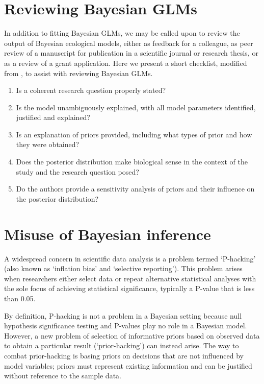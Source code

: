 \documentclass[
]{book}
\begin{document}
\hypertarget{reviewing-bayesian-glms}{%
\section{Reviewing Bayesian GLMs}\label{reviewing-bayesian-glms}}

In addition to fitting Bayesian GLMs, we may be called upon to review the output of Bayesian ecological models, either as feedback for a colleague, as peer review of a manuscript for publication in a scientific journal or research thesis, or as a review of a grant application. Here we present a short checklist, modified from \citet{Depaoli_2017}, to assist with reviewing Bayesian GLMs.

\begin{enumerate}
\def\labelenumi{\arabic{enumi}.}
\item
  Is a coherent research question properly stated?
\item
  Is the model unambiguously explained, with all model parameters identified, justified and explained?
\item
  Is an explanation of priors provided, including what types of prior and how they were obtained?
\item
  Does the posterior distribution make biological sense in the context of the study and the research question posed?
\item
  Do the authors provide a sensitivity analysis of priors and their influence on the posterior distribution?
\end{enumerate}

\hypertarget{misuse}{%
\section{Misuse of Bayesian inference}\label{misuse}}

A widespread concern in scientific data analysis is a problem termed `P-hacking' (also known as `inflation bias' and `selective reporting'). This problem arises when researchers either select data or repeat alternative statistical analyses with the sole focus of achieving statistical significance, typically a P-value that is less than 0.05.

By definition, P-hacking is not a problem in a Bayesian setting because null hypothesis significance testing and P-values play no role in a Bayesian model. However, a new problem of selection of informative priors based on observed data to obtain a particular result (`prior-hacking') can instead arise. The way to combat prior-hacking is basing priors on decisions that are not influenced by model variables; priors must represent existing information and can be justified without reference to the sample data.
\end{document}
